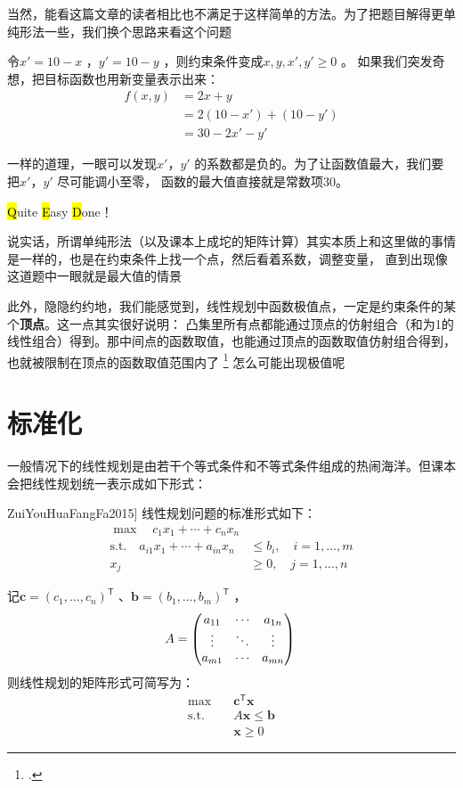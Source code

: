 \documentclass{../mathnotes-art}
\renewcommand{\c}{\mathbf{c}}
\renewcommand{\b}{\mathbf{b}}
\newcommand{\x}{\mathbf{x}}
\begin{document}
当然，能看这篇文章的读者相比也不满足于这样简单的方法。为了把题目解得更单纯形法一些，我们换个思路来看这个问题

令\(x' = 10-x\) ，\(y' = 10-y\) ，则约束条件变成\(x, y, x', y'\geq 0\) 。
如果我们突发奇想，把目标函数也用新变量表示出来：
\begin{align*}
    f(x,y) &= 2x + y \\
    &= 2(10 - x') + (10 - y') \\
    &= 30 - 2x' - y'
\end{align*}

一样的道理，一眼可以发现\(x'\)，\(y'\) 的系数都是负的。为了让函数值最大，我们要把\(x'\)，\(y'\) 尽可能调小至零，
函数的最大值直接就是常数项30。

\hl{Q}uite \hl{E}asy \hl{D}one！

说实话，所谓单纯形法（以及课本上成坨的矩阵计算）其实本质上和这里做的事情是一样的，也是在约束条件上找一个点，然后看着系数，调整变量，
直到出现像这道题中一眼就是最大值的情景

此外，隐隐约约地，我们能感觉到，线性规划中函数极值点，一定是约束条件的某个\textbf{顶点}。这一点其实很好说明：
凸集里所有点都能通过顶点的仿射组合（和为1的线性组合）得到。那中间点的函数取值，也能通过顶点的函数取值仿射组合得到，
也就被限制在顶点的函数取值范围内了
\footcite[严谨证明可见最优化方法][p.~27]{ZuiYouHuaFangFa2015}
怎么可能出现极值呢

\section{标准化}
一般情况下的线性规划是由若干个等式条件和不等式条件组成的热闹海洋。但课本会把线性规划统一表示成如下形式：
\begin{definition}[线性规划的标准形式\cite[p.~24]{ZuiYouHuaFangFa2015}]
    线性规划问题的标准形式如下：
    \begin{align*}
        \max \quad c_{1}x_{1}  + \cdots + c_{n}x_{n} & \\
        \text{s.t.} \quad a_{i1}x_{1}  + \cdots +
        a_{in}x_{n} & \leq b_{i}, \quad i = 1, \ldots, m \\
        x_{j} & \geq 0, \quad j = 1, \ldots, n
    \end{align*}

    记\(\c = (c_{1}, \dots, c_{n})^{\mathsf{T}}\) 、\(\b =
    (b_{1},\dots, b_{m})^{\mathsf{T}}\) ，
    \[
        A =
        \begin{pmatrix}
            a_{11} & \cdots & a_{1n} \\
            \vdots & \ddots & \vdots \\
            a_{m1} & \cdots & a_{mn}
        \end{pmatrix} \\
    \]
    则线性规划的矩阵形式可简写为：
    \begin{align*}
        \max \quad & \c^{\mathsf{T}} \x \\
        \text{s.t.} \quad & A \x \leq \b \\
        & \x \geq 0
    \end{align*}
\end{definition}
\end{document}
